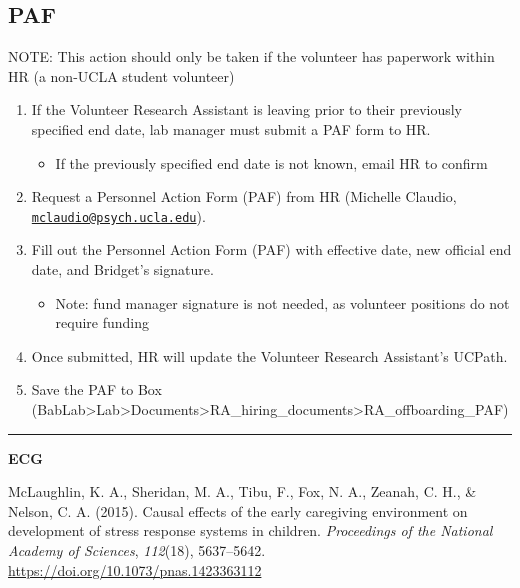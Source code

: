 \documentclass[]{book}
\providecommand{\tightlist}{%
  \setlength{\itemsep}{0pt}\setlength{\parskip}{0pt}}
\begin{document}
\subsection{PAF}\label{paf}

NOTE: This action should only be taken if the volunteer has paperwork
within HR (a non-UCLA student volunteer)

\begin{enumerate}
\def\labelenumi{\arabic{enumi}.}
\tightlist
\item
  If the Volunteer Research Assistant is leaving prior to their
  previously specified end date, lab manager must submit a PAF form to
  HR.

  \begin{itemize}
  \tightlist
  \item
    If the previously specified end date is not known, email HR to
    confirm
  \end{itemize}
\item
  Request a Personnel Action Form (PAF) from HR (Michelle Claudio,
  \href{mailto:mclaudio@psych.ucla.edu}{\nolinkurl{mclaudio@psych.ucla.edu}}).
\item
  Fill out the Personnel Action Form (PAF) with effective date, new
  official end date, and Bridget's signature.

  \begin{itemize}
  \tightlist
  \item
    Note: fund manager signature is not needed, as volunteer positions
    do not require funding
  \end{itemize}
\item
  Once submitted, HR will update the Volunteer Research Assistant's
  UCPath.
\item
  Save the PAF to Box
  (BabLab\textgreater{}Lab\textgreater{}Documents\textgreater{}RA\_hiring\_documents\textgreater{}RA\_offboarding\_PAF)
\end{enumerate}

\begin{center}\rule{0.5\linewidth}{0.5pt}\end{center}

\textbf{ECG}

McLaughlin, K. A., Sheridan, M. A., Tibu, F., Fox, N. A., Zeanah, C. H.,
\& Nelson, C. A. (2015). Causal effects of the early caregiving
environment on development of stress response systems in children.
\emph{Proceedings of the National Academy of Sciences}, \emph{112}(18),
5637--5642.\\
\url{https://doi.org/10.1073/pnas.1423363112}
\end{document}
